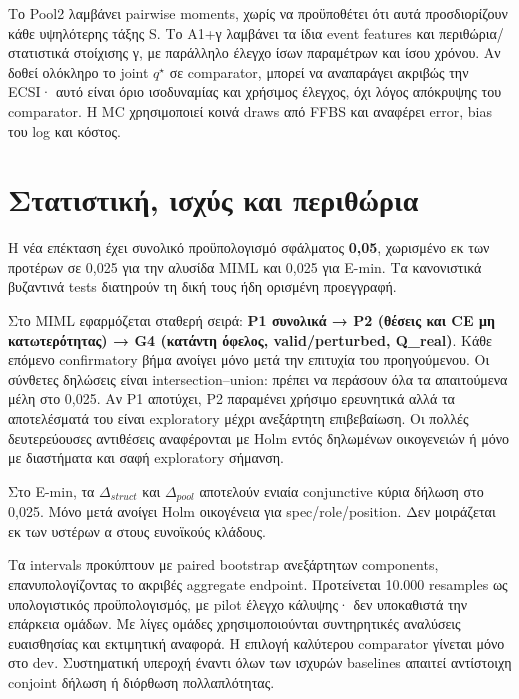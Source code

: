 \documentclass[
  10pt,
  a4paper,
]{report}
\begin{document}
Το Pool2 λαμβάνει pairwise moments, χωρίς να προϋποθέτει ότι αυτά
προσδιορίζουν κάθε υψηλότερης τάξης S. Το A1+γ λαμβάνει τα ίδια event
features και περιθώρια/στατιστικά στοίχισης γ, με παράλληλο έλεγχο ίσων
παραμέτρων και ίσου χρόνου. Αν δοθεί ολόκληρο το joint \(q^\star\) σε
comparator, μπορεί να αναπαράγει ακριβώς την ECSI· αυτό είναι όριο
ισοδυναμίας και χρήσιμος έλεγχος, όχι λόγος απόκρυψης του comparator. Η
MC χρησιμοποιεί κοινά draws από FFBS και αναφέρει error, bias του log
και κόστος.

\section{Στατιστική, ισχύς και
περιθώρια}\label{ux3c3ux3c4ux3b1ux3c4ux3b9ux3c3ux3c4ux3b9ux3baux3ae-ux3b9ux3c3ux3c7ux3cdux3c2-ux3baux3b1ux3b9-ux3c0ux3b5ux3c1ux3b9ux3b8ux3ceux3c1ux3b9ux3b1}

Η νέα επέκταση έχει συνολικό προϋπολογισμό σφάλματος \textbf{0,05},
χωρισμένο εκ των προτέρων σε 0,025 για την αλυσίδα MIML και 0,025 για
E-min. Τα κανονιστικά βυζαντινά tests διατηρούν τη δική τους ήδη
ορισμένη προεγγραφή.

Στο MIML εφαρμόζεται σταθερή σειρά: \textbf{P1 συνολικά → P2 (θέσεις και
CE μη κατωτερότητας) → G4 (κατάντη όφελος, valid/perturbed, Q\_real)}.
Κάθε επόμενο confirmatory βήμα ανοίγει μόνο μετά την επιτυχία του
προηγούμενου. Οι σύνθετες δηλώσεις είναι intersection--union: πρέπει να
περάσουν όλα τα απαιτούμενα μέλη στο 0,025. Αν P1 αποτύχει, P2 παραμένει
χρήσιμο ερευνητικά αλλά τα αποτελέσματά του είναι exploratory μέχρι
ανεξάρτητη επιβεβαίωση. Οι πολλές δευτερεύουσες αντιθέσεις αναφέρονται
με Holm εντός δηλωμένων οικογενειών ή μόνο με διαστήματα και σαφή
exploratory σήμανση.

Στο E-min, τα \(\Delta_{struct}\) και \(\Delta_{pool}\) αποτελούν ενιαία
conjunctive κύρια δήλωση στο 0,025. Μόνο μετά ανοίγει Holm οικογένεια
για spec/role/position. Δεν μοιράζεται εκ των υστέρων α στους ευνοϊκούς
κλάδους.

Τα intervals προκύπτουν με paired bootstrap ανεξάρτητων components,
επανυπολογίζοντας το ακριβές aggregate endpoint. Προτείνεται 10.000
resamples ως υπολογιστικός προϋπολογισμός, με pilot έλεγχο κάλυψης· δεν
υποκαθιστά την επάρκεια ομάδων. Με λίγες ομάδες χρησιμοποιούνται
συντηρητικές αναλύσεις ευαισθησίας και εκτιμητική αναφορά. Η επιλογή
καλύτερου comparator γίνεται μόνο στο dev. Συστηματική υπεροχή έναντι
όλων των ισχυρών baselines απαιτεί αντίστοιχη conjoint δήλωση ή διόρθωση
πολλαπλότητας.
\end{document}
